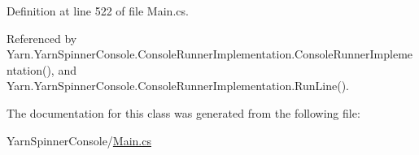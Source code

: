 Definition at line 522 of file Main.\-cs.



Referenced by Yarn.\-Yarn\-Spinner\-Console.\-Console\-Runner\-Implementation.\-Console\-Runner\-Implementation(), and Yarn.\-Yarn\-Spinner\-Console.\-Console\-Runner\-Implementation.\-Run\-Line().



The documentation for this class was generated from the following file\-:\begin{DoxyCompactItemize}
\item 
Yarn\-Spinner\-Console/\hyperlink{a00328}{Main.\-cs}\end{DoxyCompactItemize}
